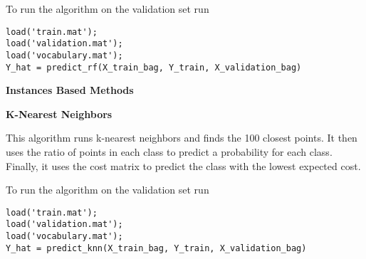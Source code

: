 \documentclass[12pt, a4paper]{article}
\begin{document}
To run the algorithm on the validation set run
\begin{verbatim}
load('train.mat');
load('validation.mat');
load('vocabulary.mat');
Y_hat = predict_rf(X_train_bag, Y_train, X_validation_bag)
\end{verbatim}

\vspace{5mm}

{\Large\textbf{Instances Based Methods}}

\vspace{3mm}

{\large\textbf{K-Nearest Neighbors}}

\vspace{3mm}

This algorithm runs k-nearest neighbors and finds the 100 closest points. It then uses the ratio of points in each class to predict a probability for each class. Finally, it uses the cost matrix to predict the class with the lowest expected cost. 

To run the algorithm on the validation set run
\begin{verbatim}
load('train.mat');
load('validation.mat');
load('vocabulary.mat');
Y_hat = predict_knn(X_train_bag, Y_train, X_validation_bag)
\end{verbatim}
\end{document}
